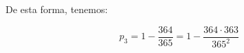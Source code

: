 De esta forma, tenemos:

\begin{equation}
p_3 = 1- \frac{364}{365} = 1 - \frac {364 \cdot 363}{365^2}
\end{equation}

%
%	
%	
%	
%	
%
%
%


